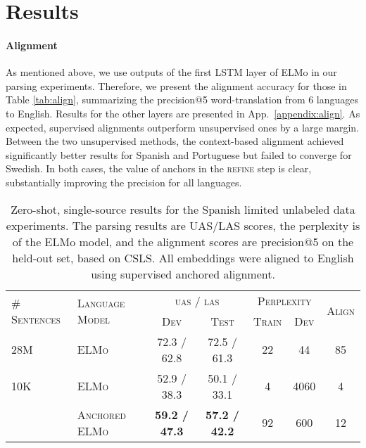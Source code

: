 \documentclass[11pt,a4paper]{article}
\newcommand{\tabref}[1]{Table \ref{#1}}
\newcommand{\appref}[1]{App.~\ref{#1}}
\begin{document}
\section{Results}\label{sec:results}

\paragraph{Alignment} 
As mentioned above, we use outputs of the first LSTM layer of ELMo in our parsing experiments. Therefore, we present the alignment accuracy for those in \tabref{tab:align}, summarizing the precision@5 word-translation from 6 languages to English. Results for the other layers are presented in \appref{appendix:align}. As expected, supervised alignments outperform unsupervised ones by a large margin. Between the two unsupervised methods, the context-based alignment achieved significantly better results for Spanish and Portuguese but failed to converge for Swedish. In both cases, the value of anchors in the \textsc{refine} step is clear, substantially improving the precision for all languages.







\begin{table*}[t!]
\centering
\begin{tabular}{l|l|cc|cc|c}
\toprule
\multirow{2}{*}{\textsc{\# Sentences}} & \multirow{2}{*}{\textsc{Language Model}} &
      \multicolumn{2}{c}{\textsc{uas / las}} &
\multicolumn{2}{c}{\textsc{Perplexity}} & \multirow{2}{*}{\textsc{Align}}\\
      & &  \textsc{Dev} & \textsc{Test} & \textsc{Train} & \textsc{Dev} & \\
\midrule
28M          & \textsc{ELMo}                         & 72.3 / 62.8 & 72.5 / 61.3 & 22         & 44       & 85    \\ \midrule
 10K         & \textsc{ELMo}                      & 52.9 / 38.3 & 50.1 / 33.1 & 4          & 4060     & 4     \\ & \textsc{Anchored ELMo}         & \textbf{59.2 / 47.3} & \textbf{57.2 / 42.2} & 92         & 600      & 12    \\ \bottomrule
\end{tabular}
\caption{Zero-shot, single-source results for the Spanish limited unlabeled data experiments. The parsing results are UAS/LAS scores, the perplexity is of the ELMo model, and the alignment scores are precision@5 on the held-out set, based on CSLS. All embeddings were aligned to English using supervised anchored alignment.}
\label{tab:es_low}
\end{table*}
\end{document}
